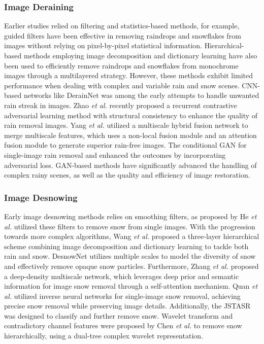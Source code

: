 \subsubsection{Image Deraining}
%
    Earlier studies relied on filtering and statistics-based methods, for example, guided filters \citep{xu2012removing} have been effective in removing raindrops and snowflakes from images without relying on pixel-by-pixel statistical information. Hierarchical-based methods employing image decomposition and dictionary learning \citep{wang2017hierarchical} have also been used to efficiently remove raindrops and snowflakes from monochrome images through a multilayered strategy. However, these methods exhibit limited performance when dealing with complex and variable rain and snow scenes. CNN-based networks like DerainNet\citep{fu2017clearing} was among the early attempts to handle unwanted rain streak in images. Zhao \textit{et al.} \citep{zhao2024cycle} recently proposed a recurrent contrastive adversarial learning method with structural consistency to enhance the quality of rain removal images. Yang \textit{et al.} \citep{yang2024single} utilized a multiscale hybrid fusion network to merge multiscale features, which uses a non-local fusion module and an attention fusion module to generate superior rain-free images. The conditional GAN \citep{yang2022rain} for single-image rain removal and enhanced the outcomes by incorporating adversarial loss. GAN-based methods have significantly advanced the handling of complex rainy scenes, as well as the quality and efficiency of image restoration.
%
\subsubsection{Image Desnowing}
%
    Early image desnowing methods relies on smoothing filters, as proposed by He \textit{et al.} \citep{xu2012removing} utilized these filters to remove snow from single images. With the progression towards more complex algorithms, Wang \textit{et al.} \citep{wang2017hierarchical} proposed a three-layer hierarchical scheme combining image decomposition and dictionary learning to tackle both rain and snow. DesnowNet \citep{liu2018desnownet} utilizes multiple scales to model the diversity of snow and effectively remove opaque snow particles. Furthermore, Zhang \textit{et al.} \citep{zhang2021deep} proposed a deep-density multiscale network, which leverages deep prior and semantic information for image snow removal through a self-attention mechanism. Quan \textit{et al.} \citep{quan2023image} utilized inverse neural networks for single-image snow removal, achieving precise snow removal while preserving image details. Additionally, the JSTASR \citep{chen2020jstasr} was designed to classify and further remove snow. Wavelet transform and contradictory channel features were proposed by Chen \textit{et al.} \citep{chen2021all} to remove snow hierarchically, using a dual-tree complex wavelet representation.
%
